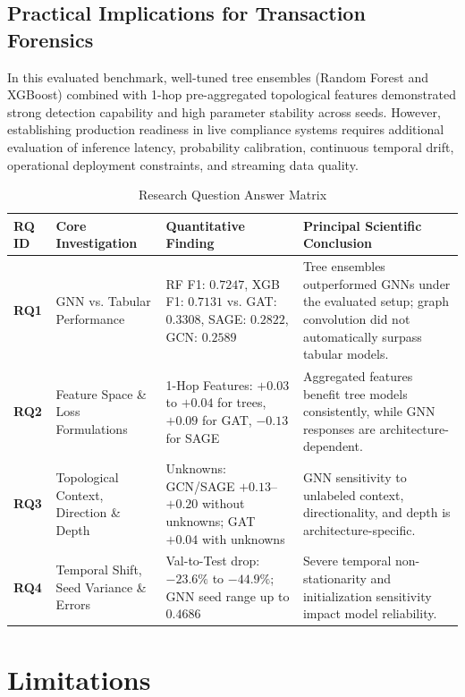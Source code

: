 \documentclass[conference]{IEEEtran}
\begin{document}
\subsection{Practical Implications for Transaction Forensics}
In this evaluated benchmark, well-tuned tree ensembles (Random Forest and XGBoost) combined with 1-hop pre-aggregated topological features demonstrated strong detection capability and high parameter stability across seeds. However, establishing production readiness in live compliance systems requires additional evaluation of inference latency, probability calibration, continuous temporal drift, operational deployment constraints, and streaming data quality.

\begin{table}[t]
\centering
\caption{Research Question Answer Matrix}
\label{tab:rq_matrix}
\begin{tabular}{p{1.2cm}p{3.5cm}p{4.2cm}p{6.5cm}}
\toprule
\textbf{RQ ID} & \textbf{Core Investigation} & \textbf{Quantitative Finding} & \textbf{Principal Scientific Conclusion} \\
\midrule
\textbf{RQ1} & GNN vs. Tabular Performance & RF F1: $0.7247$, XGB F1: $0.7131$ vs. GAT: $0.3308$, SAGE: $0.2822$, GCN: $0.2589$ & Tree ensembles outperformed GNNs under the evaluated setup; graph convolution did not automatically surpass tabular models. \\
\textbf{RQ2} & Feature Space \& Loss Formulations & 1-Hop Features: $+0.03$ to $+0.04$ for trees, $+0.09$ for GAT, $-0.13$ for SAGE & Aggregated features benefit tree models consistently, while GNN responses are architecture-dependent. \\
\textbf{RQ3} & Topological Context, Direction \& Depth & Unknowns: GCN/SAGE $+0.13$--$+0.20$ without unknowns; GAT $+0.04$ with unknowns & GNN sensitivity to unlabeled context, directionality, and depth is architecture-specific. \\
\textbf{RQ4} & Temporal Shift, Seed Variance \& Errors & Val-to-Test drop: $-23.6\%$ to $-44.9\%$; GNN seed range up to $0.4686$ & Severe temporal non-stationarity and initialization sensitivity impact model reliability. \\
\bottomrule
\end{tabular}
\end{table}

\section{Limitations}
\end{document}
